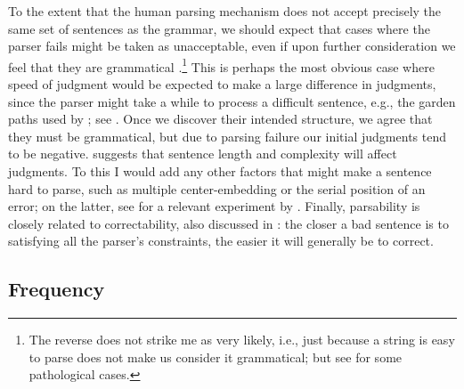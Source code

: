 To the extent that the human parsing mechanism does not accept precisely the same set of sentences as the grammar, we should expect that cases where the parser fails might be taken as unacceptable, even if upon further consideration we feel that they are 
grammatical \citep{ClarkEtAl1974}.\footnote{The reverse does not strike me as very likely, i.e., just because a string is easy to parse does not make us consider it grammatical; but see  for some pathological cases.}
This is perhaps the most obvious case where speed of judgment would be expected to make a large difference in judgments, since the parser might take a while to process a difficult sentence, e.g., the garden paths used by \citet{WarnerEtAl1987}; see .
Once we discover their intended structure, we agree that they must be grammatical, but due to parsing failure our initial judgments tend to be negative. \citet{VanKleeck1982}
suggests that sentence length and complexity will affect judgments. To this I would add any other factors that might make a sentence hard to parse, such as multiple center-embedding or the serial position of an error; on the latter, see  for a relevant experiment by \citet{Marks1967}. Finally, parsability is closely related to correctability, also discussed in : the closer a bad sentence is to satisfying all the parser's constraints, the easier it will generally be to correct.

\subsection{Frequency}\label{sec:5.3.4} 

